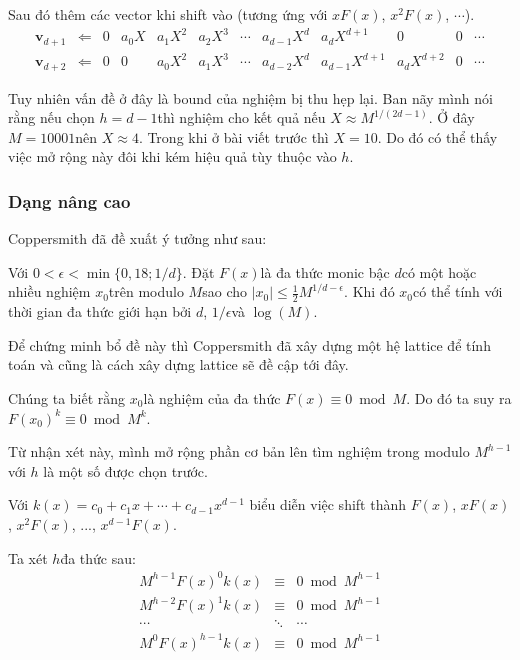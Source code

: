 Sau đó thêm các vector khi shift vào (tương ứng với $xF(x)$​, $x^2 F(x)$​, $\cdots$).​
\begin{equation*}
    \begin{array}{cccccccccccc}
        \bm{v}_{d+1} & \Leftarrow & 0 & a_0 X & a_1 X^2 & a_2 X^3 & \cdots & a_{d-1} X^d & a_d X^{d+1} & 0 & 0 & \cdots \\
        \bm{v}_{d+2} & \Leftarrow & 0 & 0 & a_0 X^2 & a_1 X^3 & \cdots & a_{d-2} X^d & a_{d-1} X^{d+1} & a_d X^{d+2} & 0 & \cdots
    \end{array}
\end{equation*}

Tuy nhiên vấn đề ở đây là bound của nghiệm bị thu hẹp lại. Ban nãy mình nói rằng nếu chọn $h=d-1$​ thì nghiệm cho kết quả nếu $X \approx M^{1/(2d-1)}$​. Ở đây $M = 10001$​ nên $X \approx 4$​. Trong khi ở bài viết trước thì $X = 10$​. Do đó có thể thấy việc mở rộng này đôi khi kém hiệu quả tùy thuộc vào $h$​.

\subsubsection*{Dạng nâng cao}

Coppersmith đã đề xuất ý tưởng như sau:

\begin{lemma}[Coppersmith]
    Với $0 < \epsilon < \min \{0,18; 1/d\}$. Đặt $F(x)$​ là đa thức monic bậc $d$​ có một hoặc nhiều nghiệm $x_0$​ trên modulo $M$​ sao cho $\lvert x_0 \rvert \leqslant \frac{1}{2} M^{1/d-\epsilon}$. Khi đó $x_0$​ có thể tính với thời gian đa thức giới hạn bởi $d$​, $1/\epsilon$​ và $\log(M)$.
\end{lemma}

Để chứng minh bổ đề này thì Coppersmith đã xây dựng một hệ lattice để tính toán và cũng là cách xây dựng lattice sẽ đề cập tới đây.

Chúng ta biết rằng $x_0$​ là nghiệm của đa thức $F(x) \equiv 0 \bmod M$​. Do đó ta suy ra $F(x_0)^k \equiv 0 \bmod M^k$​.

Từ nhận xét này, mình mở rộng phần cơ bản lên tìm nghiệm trong modulo $M^{h-1}$​ với $h$ là một số được chọn trước.

Với $k(x) = c_0 + c_1 x + \cdots + c_{d-1} x^{d-1}$ biểu diễn việc shift thành $F(x)$, $xF(x)$​, $x^2 F(x)$, ..., $x^{d-1} F(x)$​.

Ta xét $h$​ đa thức sau:
\begin{equation*}
    \begin{array}{ccc}
        M^{h-1} F(x)^0 k(x) & \equiv & 0 \bmod M^{h-1} \\
        M^{h-2} F(x)^1 k(x) & \equiv & 0 \bmod M^{h-1} \\
        \cdots & \ddots & \cdots \\
        M^0 F(x)^{h-1} k(x) & \equiv & 0 \bmod M^{h-1}
    \end{array}
\end{equation*}

